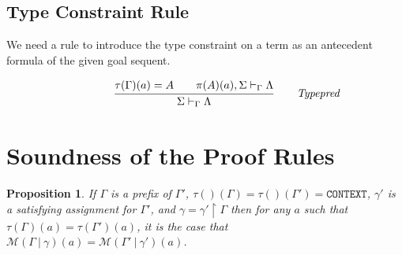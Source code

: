 \documentclass [12pt,twoside]{cslreport}
\newtheorem{prop}[thm]{Proposition}
\newcommand{\Infrule}[3]{
{{\displaystyle\strut #1}\over{\displaystyle\strut #2}}\qquad\makebox[0pt][l]{\it #3}
}
\newcommand{\tauGamma}[1]{\tau(\Gamma)(#1)}
\newcommand{\Mgamma}[1]{{\mathcal M}(\Gamma\vbar\gamma)(#1)}
\newcommand{\ttcontext}{\mathtt{CONTEXT}}
\newcommand{\vbar}{\ |\ }
\begin{document}
\subsection{Type Constraint Rule }

We need a rule to introduce the type constraint on a term as an antecedent
formula of the given goal sequent.

$$
\Infrule{\tau(\Gamma)(a) = A\qquad\sequent{\pi(A)(a),\Sigma}{\Gamma}{\Lambda}}
{\sequent{\Sigma}{\Gamma}{\Lambda}}{Typepred}
$$

\section{Soundness of the Proof Rules}
\begin{prop}\label{meaning-preservation}
If $\Gamma$ is a prefix of $\Gamma'$,
$\tau()(\Gamma) = \tau()(\Gamma') = \ttcontext$,
$\gamma'$ is a
satisfying assignment for $\Gamma'$, and $\gamma = \gamma'\restriction\Gamma$ then
for any $a$ such that 
$\tauGamma{a} = \tau(\Gamma')(a)$,  it is the case that $\Mgamma{a} =
\mathcal{M}(\Gamma'\vbar\gamma')(a)$\@.  
\end{prop}
\end{document}
